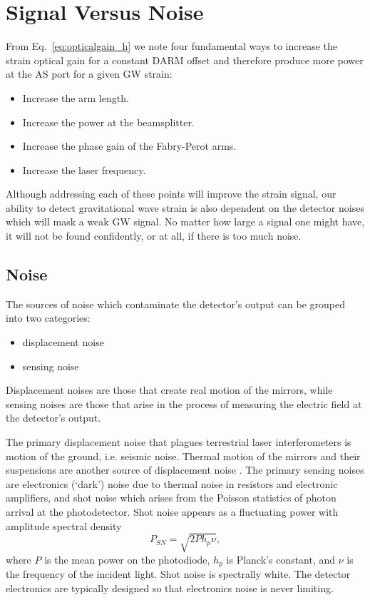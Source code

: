 \section{Signal Versus Noise} 
From Eq.~\ref{eq:opticalgain_h} we note four fundamental ways to
increase the strain optical gain for a constant DARM offset and
therefore produce more power at the AS port for a given GW strain:
\begin{itemize}
\item Increase the arm length. \vspace{-10 pt}
\item Increase the power at the beamsplitter. \vspace{-10 pt}
\item Increase the phase gain of the Fabry-Perot arms. \vspace{-10 pt}
\item Increase the laser frequency.
\end{itemize}
Although addressing each of these points will improve the strain
signal, our ability to detect gravitational wave strain is also
dependent on the detector noises which will mask a weak GW signal. No
matter how large a signal one might have, it will not be found
confidently, or at all, if there is too much noise.


\subsection{Noise}
The sources of noise which contaminate the detector's output can be
grouped into two categories:
\begin{itemize}
\item displacement noise \vspace{-10 pt}
\item sensing noise
\end{itemize}
Displacement noises are those that create real motion of the mirrors,
while
sensing noises are those that arise in the process of measuring the
electric field at the detector's output.

The primary displacement noise that plagues terrestrial laser
interferometers is motion of the ground, i.e. seismic noise.  Thermal
motion of the mirrors and their suspensions are another source of
displacement noise \cite{Saulson1990Thermal}. The primary sensing
noises are electronics (`dark') noise due to thermal noise in
resistors and electronic amplifiers, and shot noise which arises from
the Poisson statistics of photon arrival at the photodetector. Shot
noise appears as a fluctuating power with amplitude spectral density
\begin{equation}
P_{SN} = \sqrt{2 P h_p \nu}, %
\label{eq:shotnoise}
\end{equation}
where $P$ is the mean power on the photodiode, $h_p$ is Planck's
constant, and $\nu$ is the frequency of the incident light. Shot noise
is spectrally white.  The detector electronics are typically designed
so that electronics noise is never limiting.


